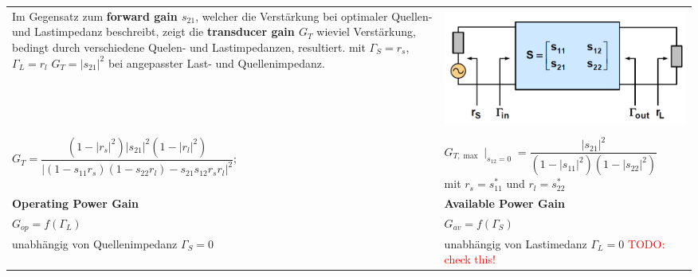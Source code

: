 \begin{tabular}{ll}
\parbox{8.5cm}{
	Im Gegensatz zum \textbf{forward gain $s_{21}$}, welcher die Verstärkung bei
	optimaler Quellen- und Lastimpedanz beschreibt, zeigt die \textbf{transducer gain $G_T$} wieviel Verstärkung,
	bedingt durch verschiedene Quelen- und Lastimpedanzen, resultiert. \\
	mit $\Gamma_S=r_s$, $\Gamma_L=r_l$ \\	
    $  G_T= |s_{21}|^2 $ bei angepasster Last- und Quellenimpedanz.\\
	} 
& \parbox{9cm}{        
        \includegraphics[height=4cm]{./bilder/components_amplifier_schematic.png}
        }\\

$  G_T= \dfrac{(1-|r_s|^2)|s_{21}|^2(1-|r_l|^2)}
   {|(1-s_{11}r_s)(1-s_{22}r_l)-s_{21}s_{12}r_sr_l|^2}; \quad $
& $  G_{T,\max}\mid_{s_{12}=0}= \dfrac{|s_{21}|^2}
   {(1-|s_{11}|^2)(1-|s_{22}|^2)} \quad$ mit $r_s=s_{11}^*$ und $r_l=s_{22}^*$\\

\textbf{Operating Power Gain}
    & \textbf{Available Power Gain} \\
$G_{op}= f(\Gamma_L)  $ 
    & $G_{av}= f(\Gamma_S) $ \\
unabhängig von Quellenimpedanz $\Gamma_S = 0$
    & unabhängig von Lastimedanz $\Gamma_L = 0$ \textcolor{red}{TODO: check this!}
\end{tabular} \\

